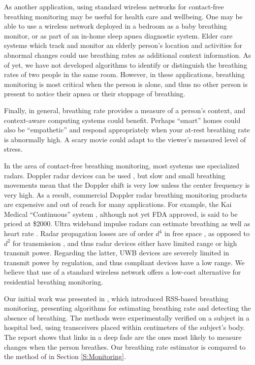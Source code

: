 \documentclass[10pt,journal,letterpaper]{IEEEtran}
\begin{document}
As another application, using standard wireless networks for contact-free breathing monitoring may be useful for health care and wellbeing.  One may be able to use a wireless network deployed in a bedroom as a baby breathing monitor, or as part of an in-home sleep apnea diagnostic system.  
Elder care systems which track and monitor an elderly person's location and activities for abnormal changes could use breathing rates as additional context information.  As of yet, we have not developed algorithms to identify or distinguish the breathing rates of two people in the same room.  However, in these applications, breathing monitoring is most critical when the person is alone, and thus no other person is present to notice their apnea or their stoppage of breathing.  

Finally, in general, breathing rate provides a measure of a person's context, and context-aware computing systems could benefit.  Perhaps ``smart'' homes could also be ``empathetic'' and respond appropriately when your at-rest breathing rate is abnormally high.  A scary movie could adapt to the viewer's measured level of stress.








In the area of contact-free breathing monitoring, most systems use specialized radars.  Doppler radar devices can be used \cite{park2006single}, but slow and small breathing movements mean that the Doppler shift is very low unless the center frequency is very high.  As a result, commercial Doppler radar breathing monitoring products are expensive and out of reach for many applications. For example, the Kai Medical ``Continuous'' system \cite{kaimedical}, although not yet FDA approved, is said to be priced at \$2000.  Ultra wideband impulse radars can estimate breathing as well as heart rate \cite{rivera2006multi}.  Radar propagation losses are of order $d^4$ in free space \cite{rappaport2001com}, as opposed to $d^2$ for transmission \cite{stutzman}, and thus radar devices either have limited range or high transmit power.  Regarding the latter, UWB devices are severely limited in transmit power by regulation, and thus compliant devices have a low range.  We believe that use of a standard wireless network 
offers a low-cost alternative for residential breathing monitoring.  

Our initial work was presented in \cite{patwari11breathing}, which introduced RSS-based breathing monitoring,  presenting algorithms for estimating breathing rate and detecting the absence of breathing. The methods were experimentally verified on a subject in a hospital bed, using transceivers placed within centimeters of the subject's body.  The report shows that links in a deep fade are the ones most likely to measure changes when the person breathes.  Our breathing rate estimator is compared to the method of \cite{patwari11breathing} in Section \ref{S:Monitoring}. 
\end{document}
